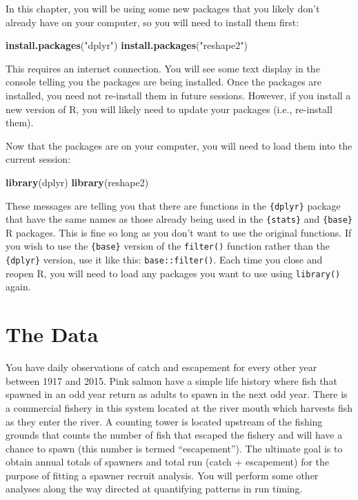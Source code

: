 \documentclass[]{book}
\newenvironment{Shaded}{\begin{snugshade}}{\end{snugshade}}
\newcommand{\KeywordTok}[1]{\textcolor[rgb]{0.13,0.29,0.53}{\textbf{#1}}}
\newcommand{\StringTok}[1]{\textcolor[rgb]{0.31,0.60,0.02}{#1}}
\newcommand{\NormalTok}[1]{#1}
\theoremstyle{definition}
\theoremstyle{definition}
\theoremstyle{definition}
\theoremstyle{remark}
\begin{document}
In this chapter, you will be using some new packages that you likely
don't already have on your computer, so you will need to install them
first:

\begin{Shaded}
\begin{Highlighting}[]
\KeywordTok{install.packages}\NormalTok{(}\StringTok{"dplyr"}\NormalTok{)}
\KeywordTok{install.packages}\NormalTok{(}\StringTok{"reshape2"}\NormalTok{)}
\end{Highlighting}
\end{Shaded}

This requires an internet connection. You will see some text display in
the console telling you the packages are being installed. Once the
packages are installed, you need not re-install them in future sessions.
However, if you install a new version of R, you will likely need to
update your packages (i.e., re-install them).

Now that the packages are on your computer, you will need to load them
into the current session:

\begin{Shaded}
\begin{Highlighting}[]
\KeywordTok{library}\NormalTok{(dplyr)}
\KeywordTok{library}\NormalTok{(reshape2)}
\end{Highlighting}
\end{Shaded}

These messages are telling you that there are functions in the
\texttt{\{dplyr\}} package that have the same names as those already
being used in the \texttt{\{stats\}} and \texttt{\{base\}} R packages.
This is fine so long as you don't want to use the original functions. If
you wish to use the \texttt{\{base\}} version of the \texttt{filter()}
function rather than the \texttt{\{dplyr\}} version, use it like this:
\texttt{base::filter()}. Each time you close and reopen R, you will need
to load any packages you want to use using \texttt{library()} again.

\section{The Data}\label{the-data}

You have daily observations of catch and escapement for every other year
between 1917 and 2015. Pink salmon have a simple life history where fish
that spawned in an odd year return as adults to spawn in the next odd
year. There is a commercial fishery in this system located at the river
mouth which harvests fish as they enter the river. A counting tower is
located upstream of the fishing grounds that counts the number of fish
that escaped the fishery and will have a chance to spawn (this number is
termed ``escapement''). The ultimate goal is to obtain annual totals of
spawners and total run (catch + escapement) for the purpose of fitting a
spawner recruit analysis. You will perform some other analyses along the
way directed at quantifying patterns in run timing.
\end{document}
